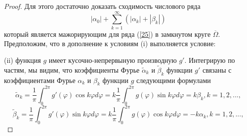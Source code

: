 \documentclass[14pt, a4paper]{extarticle}
\let\oldref\ref
\renewcommand{\ref}[1]{(\oldref{#1})}
\begin{document}
    		  	\begin{proof}Для этого достаточно доказать сходимость числового ряда
    		  	\begin{equation}
    		  		|\alpha_0| + \sum_{k=1}^{\infty}(|\alpha_k| + |\beta_k|)
   		  		\end{equation}      		  
   		  		который является мажорирующим для ряда \ref{25} в замкнутом круге $\overline{\Omega}$. Предположим, что в дополнение к условиям (i) выполняется условие:
   		  		
   		  		(ii) функция $g$  имеет кусочно-непрервыную производную $g'$.
   		  		Интегрирую по частям, мы видим, что коэффициенты Фурье $\widetilde{\alpha}_k$ и $\widetilde{\beta}_k$ функции $g'$ связаны с коэффициентами Фурье $\alpha_k$ и $\beta_k$ функции $g$ следующими формулами
   		  		\begin{equation*}
   		  			\widetilde{\alpha}_k = \dfrac{1}{\pi} \int_{0}^{2\pi} g'(\varphi) \cos{k \varphi} d\varphi = k \dfrac{1}{\pi} \int_{0}^{2\pi} g(\varphi) \sin{k \varphi} d\varphi = k\beta_k, k = 1, 2, ...,
	  			\end{equation*}  		  		
   		  		\begin{equation*}
	  				\widetilde{\beta}_k = \dfrac{1}{\pi} \int_{0}^{2\pi} g'(\varphi) \sin{k \varphi} d\varphi = k \dfrac{1}{\pi} \int_{0}^{2\pi} g(\varphi) \cos{k \varphi} d\varphi = -k\alpha_k, k = 1, 2, ...,
	  			\end{equation*}  		
	  			

\end{proof}
\end{document}
